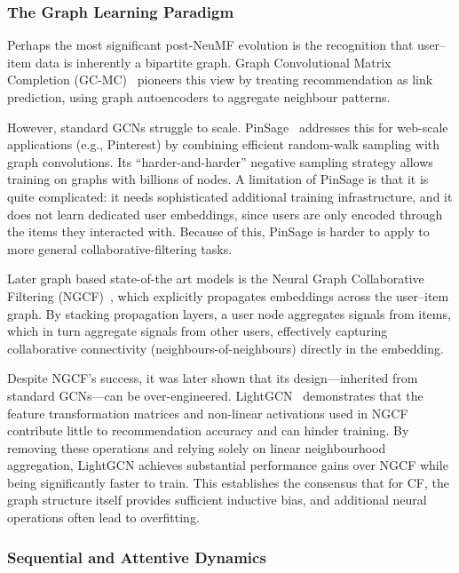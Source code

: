 \documentclass[11pt]{article}
\begin{document}
\subsubsection{The Graph Learning Paradigm}

Perhaps the most significant post-NeuMF evolution is the recognition that user--item data is inherently a bipartite graph. Graph Convolutional Matrix Completion (GC-MC)~\cite{berg2017graph} pioneers this view by treating recommendation as link prediction, using graph autoencoders to aggregate neighbour patterns.

However, standard GCNs struggle to scale. PinSage~\cite{ying2018pinsage} addresses this for web-scale applications (e.g., Pinterest) by combining efficient random-walk sampling with graph convolutions. Its ``harder-and-harder'' negative sampling strategy allows training on graphs with billions of nodes. A limitation of PinSage is that it is quite complicated: it needs sophisticated additional training infrastructure, and it does not learn dedicated user embeddings, since users are only encoded through the items they interacted with. Because of this, PinSage is harder to apply to more general collaborative-filtering tasks.

Later graph based state-of-the art models is the Neural Graph Collaborative Filtering (NGCF)~\cite{wang2019ngcf}, which explicitly propagates embeddings across the user--item graph. By stacking propagation layers, a user node aggregates signals from items, which in turn aggregate signals from other users, effectively capturing collaborative connectivity (neighbours-of-neighbours) directly in the embedding.

Despite NGCF's success, it was later shown that its design—inherited from standard GCNs—can be over-engineered. LightGCN~\cite{he2020lightgcn} demonstrates that the feature transformation matrices and non-linear activations used in NGCF contribute little to recommendation accuracy and can hinder training. By removing these operations and relying solely on linear neighbourhood aggregation, LightGCN achieves substantial performance gains over NGCF while being significantly faster to train. This establishes the consensus that for CF, the graph structure itself provides sufficient inductive bias, and additional neural operations often lead to overfitting.

\subsubsection{Sequential and Attentive Dynamics}
\end{document}

